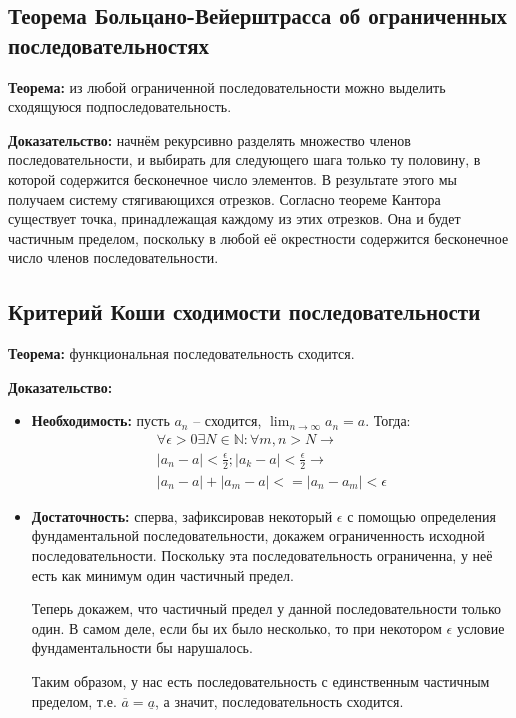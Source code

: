 \documentclass{article}
\begin{document}
\subsection{Теорема Больцано-Вейерштрасса об ограниченных последовательностях}

\textbf{Теорема:} из любой ограниченной последовательности можно выделить сходящуюся подпоследовательность.

\textbf{Доказательство:} начнём рекурсивно разделять множество членов последовательности, и выбирать для следующего шага только ту половину, в которой содержится бесконечное число элементов. В результате этого мы получаем систему стягивающихся отрезков. Согласно теореме Кантора существует точка, принадлежащая каждому из этих отрезков. Она и будет частичным пределом, поскольку в любой её окрестности содержится бесконечное число членов последовательности.

\subsection{Критерий Коши сходимости последовательности}

\textbf{Теорема:} функциональная последовательность сходится.

\textbf{Доказательство:} 
\begin{itemize}
    \item \textbf{Необходимость:} пусть $a_n$ -- сходится, $\lim_{n\rightarrow\infty}a_n = a$. Тогда:
    \begin{multline}
     \forall\epsilon > 0 \exists N\in\mathbb{N}:\forall m, n > N \rightarrow \\ |a_n - a| < \frac{\epsilon}{2}; |a_k - a| < \frac{\epsilon}{2} \rightarrow \\
    |a_n - a| + |a_m - a| <= |a_n - a_m| < \epsilon
    \end{multline}
    
    \item \textbf{Достаточность:} сперва, зафиксировав некоторый $\epsilon$ с помощью определения фундаментальной последовательности, докажем ограниченность исходной последовательности. Поскольку эта последовательность ограниченна, у неё есть как минимум один частичный предел. 
    
    Теперь докажем, что частичный предел у данной последовательности только один. В самом деле, если бы их было несколько, то при некотором $\epsilon$ условие фундаментальности бы нарушалось.

    Таким образом, у нас есть последовательность с единственным частичным пределом, т.е. $\overline{a} = \underline{a}$, а значит, последовательность сходится.   
\end{itemize}
\end{document}
